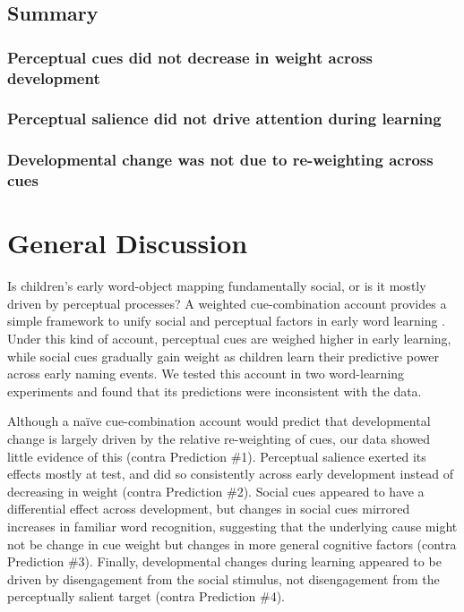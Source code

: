 \documentclass[man,floatsintext]{apa6}
\begin{document}
\subsection{Summary}


\subsubsection{Perceptual cues did not decrease in weight across development}

\subsubsection{Perceptual salience did not drive attention during learning} 

\subsubsection{Developmental change was not due to re-weighting across cues} 


\section{General Discussion}

Is children's early word-object mapping fundamentally social, or is it mostly driven by perceptual processes? A weighted cue-combination account provides a simple framework to unify social and perceptual factors in early word learning \cite{Hollich2000, Frank2013a}. Under this kind of account, perceptual cues are weighed higher in early learning, while social cues gradually gain weight as children learn their predictive power across early naming events. We tested this account in two word-learning experiments and found that its predictions were inconsistent with the data. 

Although a na\"{i}ve cue-combination account would predict that developmental change is largely driven by the relative re-weighting of cues, our data showed little evidence of this (contra Prediction \#1). Perceptual salience exerted its effects mostly at test, and did so consistently across early development instead of decreasing in weight (contra Prediction \#2). Social cues appeared to have a differential effect across development, but changes in social cues mirrored increases in familiar word recognition, suggesting that the underlying cause might not be change in cue weight but changes in more general cognitive factors (contra Prediction \#3). Finally, developmental changes during learning appeared to be driven by disengagement from the social stimulus, not disengagement from the perceptually salient target (contra Prediction \#4). 
\end{document}
